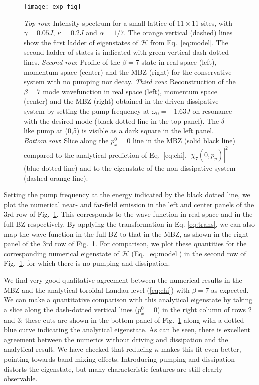 \documentclass[twocolumn, 10pt, aps, superscriptaddress, floatfix, showpacs, pra, citeautoscript]{revtex4-1}
\begin{document}
\begin{figure}[tb]
  \centering
  \texttt{[image: exp\_fig]} %
  \caption{\emph{Top row}: Intensity spectrum for a small lattice of $11 \times 11$ sites, with
    $\gamma = 0.05 J$, $\kappa = 0.2 J$ and $\alpha=1/7$. The orange vertical (dashed) lines
    show the first ladder of eigenstates of $\mathcal{H}$ from Eq.~\eqref{eq:model}. The second ladder of states is indicated with green vertical dash-dotted lines.
  \emph{Second row}: Profile of the $\beta=7$ state in real space
    (left), momentum space (center) and the MBZ (right) for the conservative system with no pumping nor decay.
    \emph{Third row}: Reconstruction of the $\beta=7$ mode wavefunction in real space (left), momentum space (center) and the MBZ (right) obtained in the driven-dissipative system by setting the pump frequency at $\omega_0 = -1.63 J$ on resonance with the desired mode (black dotted line in the top panel).
The $\delta$-like pump at (0,5) is visible as a dark square in the left panel.
    \emph{Bottom row}: Slice along the $p_x^0 = 0$ line in the MBZ
    (solid black line) compared to the analytical prediction of
    Eq.~\eqref{eq:chi}, $|\chi_7(0,p_y)|^2$ (blue dotted line) and to the eigenstate of the non-dissipative system (dashed orange line).}
  \label{fig:exp}
\end{figure}


Setting the pump frequency at the energy indicated by the black dotted
line, we plot the numerical near- and far-field emission in the left and center panels of the 3rd row of Fig.~\ref{fig:exp}. This corresponds to 
the wave function in real space and in the full
BZ respectively. By applying the transformation in Eq. \ref{eq:trans}, we can also map the wave function in the full BZ to that in the MBZ, as shown in the right panel of the 3rd row of Fig.~\ref{fig:exp}. For comparison, we plot these
quantities for the corresponding numerical eigenstate of $\mathcal{H}$ (Eq.~\eqref{eq:model})
in the second row of Fig.~\ref{fig:exp}, for which there is no pumping and dissipation. 

We find very good qualitative agreement between the numerical results in the MBZ and the analytical toroidal Landau level (\ref{eq:chi}) with $\beta=7$ as expected. We can make a quantitative comparison with this analytical eigenstate by taking
a slice along the dash-dotted vertical lines ($p_x^0 = 0$) in the
right column of rows 2 and 3; these cuts are shown in the bottom panel of Fig.~\ref{fig:exp} along with a dotted blue curve indicating the analytical eigenstate. As can be seen, there is excellent agreement between the numerics without driving and dissipation and the analytical result. We have checked that reducing $\kappa$ makes this fit even better, pointing towards band-mixing effects. Introducing pumping and dissipation distorts the eigenstate, but many characteristic features are still clearly observable. 
\end{document}

